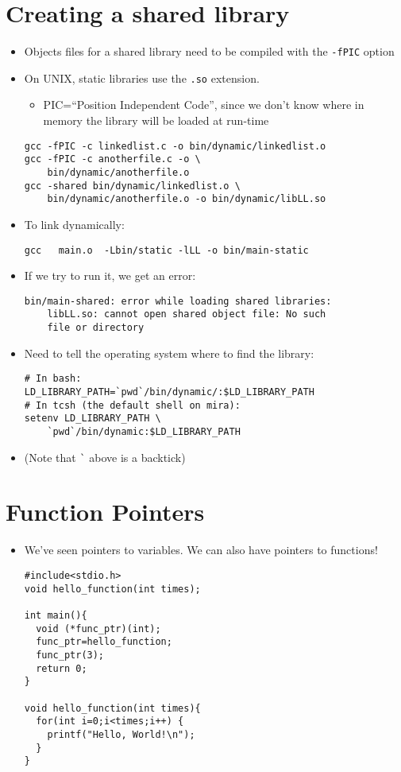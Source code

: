 \documentclass{article}
\begin{document}
\section{Creating a shared library}
\begin{itemize}
\item Objects files for a shared library need to be compiled with the \verb!-fPIC! option
\item On UNIX, static libraries use the \verb!.so! extension.
\begin{itemize}
\item PIC=``Position Independent Code'', since we don't know where in memory the library will be loaded at run-time
\end{itemize}
\begin{verbatim}
gcc -fPIC -c linkedlist.c -o bin/dynamic/linkedlist.o
gcc -fPIC -c anotherfile.c -o \
    bin/dynamic/anotherfile.o
gcc -shared bin/dynamic/linkedlist.o \
    bin/dynamic/anotherfile.o -o bin/dynamic/libLL.so
\end{verbatim}
\item To link dynamically:
\begin{verbatim}
gcc   main.o  -Lbin/static -lLL -o bin/main-static
\end{verbatim} 
\end{itemize}



\begin{itemize}
\item If we try to run it, we get an error:
\begin{verbatim}
bin/main-shared: error while loading shared libraries:
    libLL.so: cannot open shared object file: No such
    file or directory
\end{verbatim} 
\item Need to tell the operating system where to find the library:
\begin{verbatim}
# In bash:
LD_LIBRARY_PATH=`pwd`/bin/dynamic/:$LD_LIBRARY_PATH
# In tcsh (the default shell on mira):
setenv LD_LIBRARY_PATH \
    `pwd`/bin/dynamic:$LD_LIBRARY_PATH
\end{verbatim}
\item (Note that \verb!`! above is a backtick)
\end{itemize}



\section{Function Pointers}
\begin{itemize}
\item We've seen pointers to variables. We can also have pointers to functions!
\begin{verbatim}
#include<stdio.h>
void hello_function(int times);

int main(){
  void (*func_ptr)(int);
  func_ptr=hello_function;
  func_ptr(3);
  return 0;
}

void hello_function(int times){
  for(int i=0;i<times;i++) {
    printf("Hello, World!\n");
  }
}
\end{verbatim}
\end{itemize}
\end{document}
